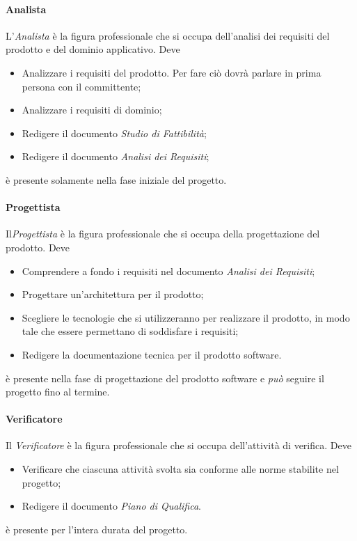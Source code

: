		\paragraph{Analista} \Spazio
		L'\emph{Analista} è la figura professionale che si occupa dell'analisi dei requisiti del prodotto e del dominio applicativo. Deve
		\begin{itemize}
			\item Analizzare i requisiti del prodotto. Per fare ciò dovrà parlare in prima persona con il committente;
			\item Analizzare i requisiti di dominio;
			\item Redigere il documento \emph{Studio di Fattibilità};
			\item Redigere il documento \emph{Analisi dei Requisiti};
		\end{itemize}
		è presente solamente nella fase iniziale del progetto.
		\paragraph{Progettista} \Spazio
		Il\emph{Progettista} è la figura professionale che si occupa della progettazione del prodotto. Deve
		\begin{itemize}
			\item Comprendere a fondo i requisiti nel documento \emph{Analisi dei Requisiti};
			\item Progettare un'architettura per il prodotto;
			\item Scegliere le tecnologie che si utilizzeranno per realizzare il prodotto, in modo tale che essere permettano di soddisfare i requisiti;
			\item Redigere la documentazione tecnica per il prodotto software.
		\end{itemize}
		è presente nella fase di progettazione del prodotto software e \emph{può} seguire il progetto fino al termine.
		\paragraph{Verificatore} \Spazio
		Il \emph{Verificatore} è la figura professionale che si occupa dell'attività di verifica. Deve
		\begin{itemize}
			\item Verificare che ciascuna attività svolta sia conforme alle norme stabilite nel progetto;
			\item Redigere il documento \emph{Piano di Qualifica}.
		\end{itemize}
		è presente per l'intera durata del progetto.
